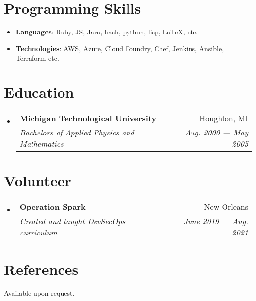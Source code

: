 \documentclass[letterpaper, 10pt]{article}
\makeatletter
\newcommand{\resumeSubheading}[4]{
  \vspace{-1pt}\item{
    \begin{tabular*}{0.97\textwidth}{l@{\extracolsep{\fill}}r}
      \textbf{#1} & #2 \\
      \textit{\small#3} & \textit{\small #4} \\
    \end{tabular*}\vspace{-5pt}}
}
\newcommand{\resumeSubHeadingListStart}{\begin{itemize}[leftmargin=*]}
\newcommand{\resumeSubHeadingListEnd}{\end{itemize}}
\makeatother
\begin{document}
\section{Programming Skills}
\resumeSubHeadingListStart
\item{
            \textbf{Languages}{: Ruby, JS, Java, bash, python, lisp, \LaTeX, etc.}
      }
\item{
            \textbf{Technologies}{: AWS, Azure, Cloud Foundry, Chef, Jenkins, Ansible, Terraform etc.}
      }
\resumeSubHeadingListEnd

\section{Education}
\resumeSubHeadingListStart
\resumeSubheading
{Michigan Technological University}{Houghton, MI}
{Bachelors of Applied Physics and Mathematics}{Aug. 2000 --- May 2005}
\resumeSubHeadingListEnd

\section{Volunteer}
\resumeSubHeadingListStart
\resumeSubheading
{Operation Spark}{New Orleans}
{Created and taught DevSecOps curriculum}{June 2019 --- Aug. 2021}
\resumeSubHeadingListEnd


\section{References}
Available upon request.

\end{document}
